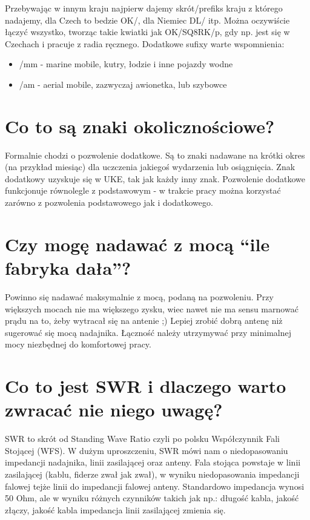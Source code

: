 \documentclass[a4paper,12pt]{article}
\begin{document}
Przebywając w innym kraju najpierw dajemy skrót/prefiks kraju z którego nadajemy, dla Czech to bedzie OK/, dla Niemiec DL/ itp. Można oczywiście łączyć wszystko, tworząc takie kwiatki jak OK/SQ8RK/p, gdy np. jest się w Czechach i pracuje z radia ręcznego.
Dodatkowe sufixy warte wspomnienia:
\begin{itemize}
\item /mm - marine mobile, kutry, łodzie i inne pojazdy wodne
\item /am - aerial mobile, zazwyczaj awionetka, lub szybowce\end{itemize}

\section{Co to są znaki okolicznościowe?}
Formalnie chodzi o pozwolenie dodatkowe. Są to znaki nadawane na krótki okres (na przykład miesiąc) dla uczczenia jakiegoś wydarzenia lub osiągnięcia. Znak dodatkowy uzyskuje się w UKE, tak jak każdy inny znak. Pozwolenie dodatkowe funkcjonuje równolegle z podstawowym - w trakcie pracy można korzystać zarówno z pozwolenia podstawowego jak i dodatkowego.

\section{Czy mogę nadawać z mocą ``ile fabryka dała''?}
Powinno się nadawać maksymalnie z mocą, podaną na pozwoleniu. Przy większych mocach nie ma większego zysku, wiec nawet nie ma sensu marnować prądu na to, żeby wytracał się na antenie ;) Lepiej zrobić dobrą antenę niż sugerować się mocą nadajnika.
Łączność należy utrzymywać przy minimalnej mocy niezbędnej do komfortowej pracy. 

\section{Co to jest SWR i dlaczego warto zwracać nie niego uwagę?}
SWR to skrót od Standing Wave Ratio czyli po polsku Współczynnik Fali Stojącej (WFS). W dużym uproszczeniu, SWR mówi nam o niedopasowaniu impedancji nadajnika, linii zasilającej oraz anteny. Fala stojąca powstaje w linii zasilającej (kablu, fiderze zwał jak zwał), w wyniku niedopasowania impedancji falowej tejże linii do impedancji falowej anteny. Standardowo impedancja wynosi 50 Ohm, ale w wyniku różnych czynników takich jak np.: długość kabla, jakość złączy, jakość kabla impedancja linii zasilającej zmienia się. 
\end{document}
